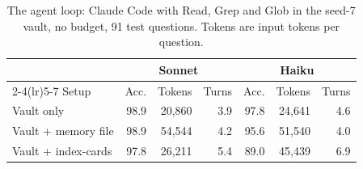 \begin{table}[t]\centering\small
\caption{The agent loop: Claude Code with Read, Grep and Glob in the seed-7 vault, no budget, 91 test questions. Tokens are input tokens per question.}\label{tab:agent}
\begin{tabular}{lrrrrrr}\toprule
& \multicolumn{3}{c}{Sonnet} & \multicolumn{3}{c}{Haiku} \\
\cmidrule(lr){2-4}\cmidrule(lr){5-7}
Setup & Acc. & Tokens & Turns & Acc. & Tokens & Turns \\
\midrule
Vault only & 98.9 & 20{,}860 & 3.9 & 97.8 & 24{,}641 & 4.6 \\
Vault + memory file & 98.9 & 54{,}544 & 4.2 & 95.6 & 51{,}540 & 4.0 \\
Vault + index-cards & 97.8 & 26{,}211 & 5.4 & 89.0 & 45{,}439 & 6.9 \\
\bottomrule\end{tabular}\end{table}
